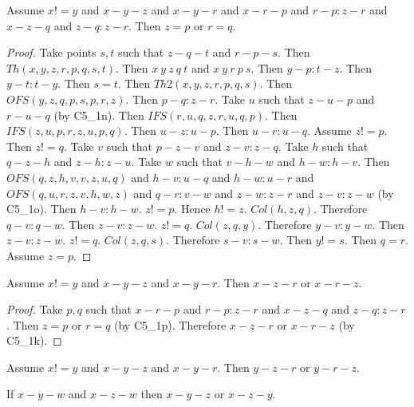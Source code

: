 \documentclass{article}
\begin{document}
  \begin{forthel}
    \begin{lemma}[C5_1p]
      Assume $x != y$ and $x-y-z$ and $x-y-r$ and $x-r-p$ and $r-p : z-r$ and $x-z-q$ and $z-q : z-r$. Then $z = p$ or $r = q$.
    \end{lemma}
    \begin{proof}
    	Take points $s,t$ such that $z-q-t$ and $r-p-s$.
    	Then $Th(x,y,z,r,p,q,s,t)$.
    	Then $x~y~z~q~t$ and $x~y~r~p~s$.
    	Then $y-p : t-z$.
    	Then $y-t : t-y$.
    	Then $s = t$.
    	Then $Th2(x,y,z,r,p,q,s)$.
    	Then $OFS(y,z,q,p,s,p,r,z)$.
    	Then $p-q : z-r$.
    	Take $u$ such that $z-u-p$ and $r-u-q$ (by C5_1n).
    	Then $IFS(r,u,q,z,r,u,q,p)$.
    	Then $IFS(z,u,p,r,z,u,p,q)$.
    	Then $u-z : u-p$.
    	Then $u-r : u-q$.
    	Assume $z != p$. Then $z != q$.
    		Take $v$ such that $p-z-v$ and $z-v : z-q$.
    		Take $h$ such that $q-z-h$ and $z-h : z-u$.
    		Take $w$ such that $v-h-w$ and $h-w : h-v$.
    		Then $OFS(q,z,h,v,v,z,u,q)$ and $h-v : u-q$ and $h-w : u-r$ and $OFS(q,u,r,z,v,h,w,z)$ and $q-r : v-w$ and $z-w : z-r$ and $z-v : z-w$ (by C5_1o).
    		Then $h-v : h-w$. $z != p$. Hence $h != z$. $Col(h,z,q)$. Therefore $q-v : q-w$.
    		Then $z-v : z-w$. $z != q$. $Col(z,q,y)$. Therefore $y-v : y-w$.
    		Then $z-v : z-w$. $z != q$. $Col(z,q,s)$. Therefore $s-v : s-w$.
    		Then $y != s$.
    		Then $q = r$.
    	Assume $z = p$.
    \end{proof}

    \begin{lemma}[D5_1]
      Assume $x != y$ and $x-y-z$ and $x-y-r$. Then $x-z-r$ or $x-r-z$.
    \end{lemma}
    \begin{proof}
    	Take $p,q$ such that $x-r-p$ and $r-p : z-r$ and $x-z-q$ and $z-q : z-r$. Then $z = p$ or $r = q$ (by C5_1p). Therefore $x-z-r$ or $x-r-z$ (by C5_1k).
    \end{proof}

    \begin{lemma}[D5_2]
      Assume $x != y$ and $x-y-z$ and $x-y-r$. Then $y-z-r$ or $y-r-z$.
    \end{lemma}

    \begin{theorem}[D5_3]
      If $x-y-w$ and $x-z-w$ then $x-y-z$ or $x-z-y$.
    \end{theorem}
  \end{forthel}
\end{document}

